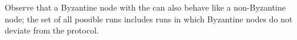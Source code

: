 Observe that a Byzantine node with the \randomHarness{} can also behave like a non-Byzantine node; the set of all possible runs includes runs in which Byzantine nodes do not deviate from the protocol.





